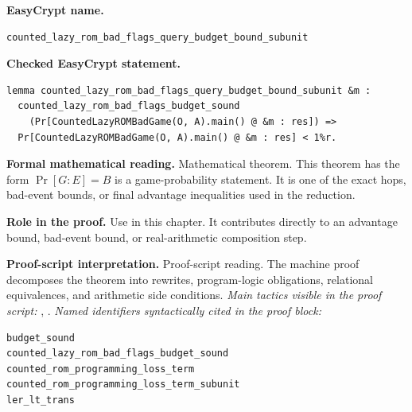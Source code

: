 \begin{formaltheorem}
\noindent\textbf{EasyCrypt name.}
\begin{lstlisting}[language=EasyCrypt,basicstyle=\ttfamily\scriptsize]
counted_lazy_rom_bad_flags_query_budget_bound_subunit
\end{lstlisting}
\noindent\textbf{Checked EasyCrypt statement.}
\begin{lstlisting}[language=EasyCrypt,basicstyle=\ttfamily\scriptsize]
lemma counted_lazy_rom_bad_flags_query_budget_bound_subunit &m :
  counted_lazy_rom_bad_flags_budget_sound
    (Pr[CountedLazyROMBadGame(O, A).main() @ &m : res]) =>
  Pr[CountedLazyROMBadGame(O, A).main() @ &m : res] < 1%r.
\end{lstlisting}
\noindent\textbf{Formal mathematical reading.}
Mathematical theorem. This theorem has the form \(\Pr[G:E] = B\) is a game-probability statement.  It is one of the exact hops, bad-event bounds, or final advantage inequalities used in the reduction.

\noindent\textbf{Role in the proof.}
Use in this chapter. It contributes directly to an advantage bound, bad-event bound, or real-arithmetic composition step.

\noindent\textbf{Proof-script interpretation.}
Proof-script reading. The machine proof decomposes the theorem into rewrites, program-logic obligations, relational equivalences, and arithmetic side conditions.
\emph{Main tactics visible in the proof script:} , .
\emph{Named identifiers syntactically cited in the proof block:}
\begin{lstlisting}[language=EasyCrypt,basicstyle=\ttfamily\scriptsize]
budget_sound
counted_lazy_rom_bad_flags_budget_sound
counted_rom_programming_loss_term
counted_rom_programming_loss_term_subunit
ler_lt_trans
\end{lstlisting}

\end{formaltheorem}

